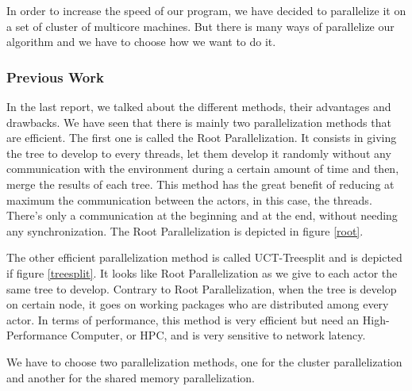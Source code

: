 In order to increase the speed of our program, we have decided to parallelize it on a set of cluster of multicore machines. But there is many ways of parallelize our algorithm and we have to choose how we want to do it. 
\subsubsection{Previous Work}
In the last report, we talked about the different methods, their advantages and drawbacks. We have seen that there is mainly two parallelization methods that are efficient.
\newline
\newline
The first one is called the Root Parallelization. It consists in giving the tree to develop to every threads, let them develop it randomly without any communication with the environment
during a certain amount of time and then, merge the results of each tree.
This method has the great benefit of reducing at maximum the communication between the actors, in this case, the threads.
There's only a communication at the beginning and at the end, without needing any synchronization. The Root Parallelization is depicted in figure \ref{root}.\newline


The other efficient parallelization method is called UCT-Treesplit and is depicted if figure \ref{treesplit}. It looks like Root Parallelization as we give to each actor the same tree to develop.
Contrary to Root Parallelization, when the tree is develop on certain node, it goes on working packages who are distributed among every actor.
In terms of performance, this method is very efficient but need an High-Performance Computer, or HPC, and is very sensitive to network latency. \newline



We have to choose two parallelization methods, one for the cluster parallelization and another for the shared memory parallelization.
